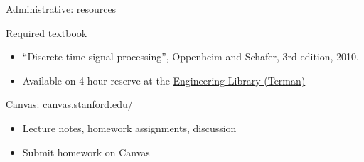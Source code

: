 \documentclass{beamer}
\begin{document}
%
\begin{frame}{Administrative: resources}
\begin{block}{Required textbook}
\begin{itemize}
\item ``Discrete-time signal processing'', Oppenheim and Schafer, 3rd edition, 2010.
\item Available on 4-hour reserve at the \href{https://campus-map.stanford.edu/?id=04-080&lat=37.42787956&lng=-122.17429865&zoom=17&srch=engineeri}{Engineering Library (Terman)}
\end{itemize}
\end{block}

\begin{block}{Canvas: \href{https://canvas.stanford.edu/}{canvas.stanford.edu/}}
\begin{itemize}
\item Lecture notes, homework assignments, discussion
\item Submit homework on Canvas
\end{itemize}
\end{block}

\end{frame}
\end{document}
